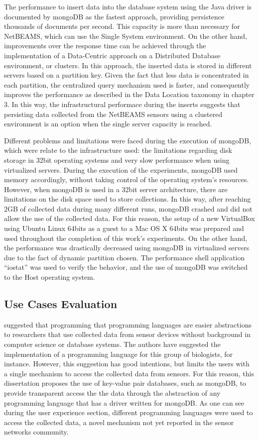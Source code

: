The performance to insert data into the database system using the Java driver
is documented by mongoDB as the fastest approach, providing persistence
thousands of documents per second. This capacity is more than necessary for
NetBEAMS, which can use the Single System environment. On the other hand,
improvements over the response time can be achieved through the implementation
of a Data-Centric approach on a Distributed Database environment, or clusters.
In this approach, the inserted data is stored in different servers based on a
partition key. Given the fact that less data is concentrated in each
partition, the centralized query mechanism used is faster, and consequently
improves the performance as described in the Data Location taxonomy in chapter
3. In this way, the infrastructural performace during the inserts suggests that
persisting data collected from the NetBEAMS sensors using a clustered
environment is an option when the single server capacity is reached.

Different problems and limitations were faced during the execution of
mongoDB, which were relate to the infrastructure used: the limitations
regarding disk storage in 32bit operating systems and very slow
performance when using virtualized servers. During the execution of the
experiments, mongoDB used memory accordingly, without taking control of the
operating system's resources. However, when mongoDB is used in a 32bit server
architecture, there are limitations on the disk space used to store
collections. In this way, after reaching 2GB of collected data during many
different runs, mongoDB crashed and did not allow the use of the collected
data. For this reason, the setup of a new VirtualBox using Ubuntu Linux 64bits
as a guest to a Mac OS X 64bits was prepared and used throughout the completion
of this work's experiments. On the other hand, the performance was drastically
decreased using mongoDB in virtualized servers due to the fact of dynamic
partition chosen. The performance shell application ``iostat'' was used to
verify the behavior, and the use of mongoDB was switched to the Host operating
system.

\subsection{Use Cases Evaluation}

\cite{sn-programming-language} suggested that programming that programming
languages are easier abstractions to researchers that use collected data from
sensor devices without background in computer science or database systems. The
authors have suggested the implementation of a programming language for this
group of biologists, for instance. However, this suggestion has good
intentions, but limits the users with a single mechanism to access the
collected data from sensors. For this reason, this dissertation proposes the
use of key-value pair databases, such as mongoDB, to provide transparent access
the the data through the abstraction of any programming language that has a
driver written for mongoDB. As one can see during the user experience section,
different programming languages were used to access the collected data, a novel
mechanism not yet reported in the sensor networks community.

